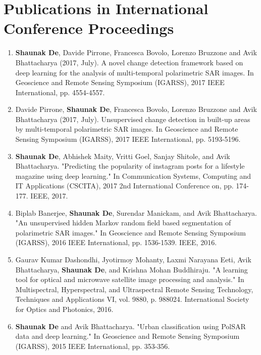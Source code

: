 \section*{Publications in International Conference Proceedings}
{\small
\begin{enumerate} 

\item {}\quad \textbf{Shaunak De}, Davide Pirrone, Francesca Bovolo, Lorenzo Bruzzone and Avik Bhattacharya (2017, July). A novel change detection framework based on deep learning for the analysis of multi-temporal polarimetric SAR images. In Geoscience and Remote Sensing Symposium (IGARSS), 2017 IEEE International, pp. 4554-4557.

\item {}\quad Davide Pirrone, \textbf{Shaunak De}, Francesca Bovolo, Lorenzo Bruzzone and Avik Bhattacharya (2017, July). Unsupervised change detection in built-up areas by multi-temporal polarimetric SAR images. In Geoscience and Remote Sensing Symposium (IGARSS), 2017 IEEE International, pp. 5193-5196. 

\item \textbf{Shaunak De}, Abhishek Maity, Vritti Goel, Sanjay Shitole, and Avik Bhattacharya. "Predicting the popularity of instagram posts for a lifestyle magazine using deep learning." In Communication Systems, Computing and IT Applications (CSCITA), 2017 2nd International Conference on, pp. 174-177. IEEE, 2017.

\item {}\quad Biplab Banerjee, \textbf{Shaunak De}, Surendar Manickam, and Avik Bhattacharya. "An unsupervised hidden Markov random field based segmentation of polarimetric SAR images." In Geoscience and Remote Sensing Symposium (IGARSS), 2016 IEEE International, pp. 1536-1539. IEEE, 2016. 

\item Gaurav Kumar Dashondhi, Jyotirmoy Mohanty, Laxmi Narayana Eeti, Avik Bhattacharya, \textbf{Shaunak De}, and Krishna Mohan Buddhiraju. "A learning tool for optical and microwave satellite image processing and analysis." In Multispectral, Hyperspectral, and Ultraspectral Remote Sensing Technology, Techniques and Applications VI, vol. 9880, p. 988024. International Society for Optics and Photonics, 2016.

\item {}\quad \textbf{Shaunak De} and Avik Bhattacharya. "Urban classification using PolSAR data and deep learning." In Geoscience and Remote Sensing Symposium (IGARSS), 2015 IEEE International, pp. 353-356.  


\end{enumerate}}
